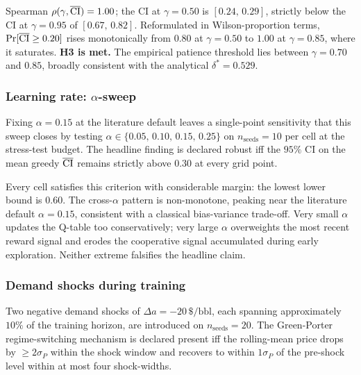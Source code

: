 \begin{verdict*}
Spearman $\rho(\gamma,\overline{\mathrm{CI}}) = 1.00$; the CI at $\gamma = 0.50$
is $[0.24,\,0.29]$, strictly below the CI at $\gamma = 0.95$
of $[0.67,\,0.82]$. Reformulated in Wilson-proportion terms,
$\Pr[\overline{\mathrm{CI}} \geq 0.20]$ rises monotonically from $0.80$ at
$\gamma = 0.50$ to $1.00$ at $\gamma = 0.85$, where it
saturates. \textbf{H3 is met.} The empirical patience threshold
lies between $\gamma = 0.70$ and $0.85$, broadly consistent
with the analytical $\delta^\ast = 0.529$.
\end{verdict*}

\subsubsection{Learning rate: \texorpdfstring{$\alpha$}{alpha}-sweep}
\label{subsec:alpha}

Fixing $\alpha = 0.15$ at the literature default leaves a
single-point sensitivity that this sweep closes by testing
$\alpha \in \{0.05,\,0.10,\,0.15,\,0.25\}$ on
$n_{\text{seeds}} = 10$ per cell at the stress-test budget.
The headline finding is declared robust iff the $95\%$ CI on
the mean greedy $\overline{\mathrm{CI}}$ remains strictly above $0.30$ at every
grid point.

Every cell satisfies this criterion with considerable margin:
the lowest lower bound is $0.60$. The cross-$\alpha$ pattern
is non-monotone, peaking near the literature default
$\alpha = 0.15$, consistent with a classical bias-variance
trade-off. Very small $\alpha$ updates the Q-table too
conservatively; very large $\alpha$ overweights the most recent
reward signal and erodes the cooperative signal accumulated
during early exploration. Neither extreme falsifies the headline
claim.

\subsubsection{Demand shocks during training}
\label{subsec:shocks}

Two negative demand shocks of $\Delta a = -20\,\$\text{/bbl}$,
each spanning approximately $10\%$ of the training horizon, are
introduced on $n_{\text{seeds}} = 20$. The Green-Porter
regime-switching mechanism is declared present iff the
rolling-mean price drops by $\geq 2\sigma_P$ within the shock
window and recovers to within $1\sigma_P$ of the pre-shock level
within at most four shock-widths.

